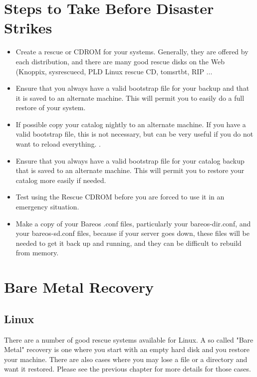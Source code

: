 \section{Steps to Take Before Disaster Strikes}
\label{steps1}


\begin{itemize}
\item Create a rescue or CDROM for your systems. Generally,
   they are offered by each distribution, and there are many good
   rescue disks on the Web (Knoppix, sysrescuecd, PLD Linux rescue CD,
   tomsrtbt, RIP ...
\item Ensure that you always have a valid bootstrap file for your backup and
   that it is saved to an alternate machine.  This will permit you to
   easily do a full restore of your system.
\item If possible copy your catalog nightly to an alternate machine.  If you
   have a valid bootstrap file, this is not necessary, but  can be very useful if
   you do not want to reload everything. .
\item Ensure that you always have a valid bootstrap file for your  catalog
   backup that is saved to an alternate machine. This will  permit you to restore
   your catalog more easily if needed.
\item Test using the Rescue CDROM before you are forced to use it in
   an emergency situation.
\item Make a copy of your Bareos .conf files, particularly your
   bareos-dir.conf, and your bareos-sd.conf files, because if your server
   goes down, these files will be needed to get it back up and running,
   and they can be difficult to rebuild from memory.
\end{itemize}

\section{Bare Metal Recovery}

\subsection{Linux}

There are a number of good rescue systems available for Linux.
A so called "Bare Metal" recovery is one where you start with an empty hard
disk and you restore your machine. There are also cases where you may lose a
file or a directory and want it restored. Please see the previous chapter for
more details for those cases.

